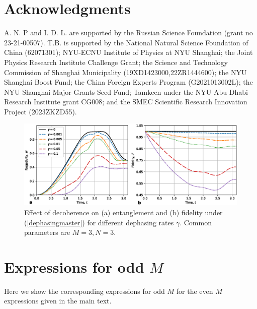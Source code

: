 \documentclass{WileyMSP-template}
\begin{document}
{\section{Acknowledgments}

A. N. P and I. D. L.  are supported by the Russian Science Foundation (grant no 23-21-00507). T.B. is supported by the National Natural Science Foundation of China (62071301); NYU-ECNU Institute of Physics at NYU Shanghai;  the Joint Physics Research Institute Challenge Grant; the Science and Technology Commission of Shanghai Municipality (19XD1423000,22ZR1444600); the NYU Shanghai Boost Fund; the China Foreign Experts Program (G2021013002L); the NYU Shanghai Major-Grants Seed Fund; Tamkeen under the NYU Abu Dhabi Research Institute grant CG008; and the SMEC Scientific Research Innovation Project (2023ZKZD55).



\begin{figure}[t]
    \centering
    \includegraphics[width=0.9\columnwidth]{negativity-fidelity-decoherence-low-m3-n3.eps}
    \caption{ Effect of decoherence on  (a)  entanglement and (b) fidelity  under (\ref{dephasingmaster}) for different dephasing rates $\gamma$. Common parameters are $M=3, N=3$.    }
    \label{decoherence}
\end{figure}



\appendix

\section{Expressions for odd $ M $}
\label{sec:oddMexpressions}

Here we show the corresponding expressions for odd $ M $ for the even $ M $ expressions given in the main text.

}
\end{document}
